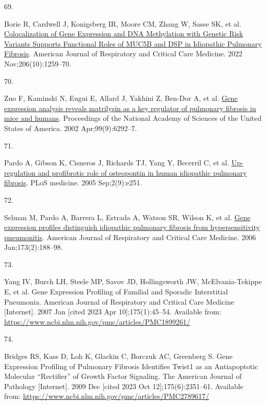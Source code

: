\documentclass[
]{article}
\newlength{\cslhangindent}
\newlength{\csllabelwidth}
\newlength{\cslentryspacingunit} %
\newenvironment{CSLReferences}[2] %
 {%
  \setlength{\parindent}{0pt}
  \ifodd #1
  \let\oldpar\par
  \def\par{\hangindent=\cslhangindent\oldpar}
  \fi
  \setlength{\parskip}{#2\cslentryspacingunit}
 }%
 {}
\newcommand{\CSLLeftMargin}[1]{\parbox[t]{\csllabelwidth}{#1}}
\newcommand{\CSLRightInline}[1]{\parbox[t]{\linewidth - \csllabelwidth}{#1}\break}
\begin{document}
\begin{CSLReferences}{0}{0}
\leavevmode{}%
\CSLLeftMargin{69. }%
\CSLRightInline{Borie R, Cardwell J, Konigsberg IR, Moore CM, Zhang W, Sasse SK, et al. \href{https://doi.org/10.1164/rccm.202110-2308OC}{Colocalization of {Gene} {Expression} and {DNA} {Methylation} with {Genetic} {Risk} {Variants} {Supports} {Functional} {Roles} of {MUC5B} and {DSP} in {Idiopathic} {Pulmonary} {Fibrosis}}. American Journal of Respiratory and Critical Care Medicine. 2022 Nov;206(10):1259--70. }

\leavevmode{}%
\CSLLeftMargin{70. }%
\CSLRightInline{Zuo F, Kaminski N, Eugui E, Allard J, Yakhini Z, Ben-Dor A, et al. \href{https://doi.org/10.1073/pnas.092134099}{Gene expression analysis reveals matrilysin as a key regulator of pulmonary fibrosis in mice and humans}. Proceedings of the National Academy of Sciences of the United States of America. 2002 Apr;99(9):6292--7. }

\leavevmode{}%
\CSLLeftMargin{71. }%
\CSLRightInline{Pardo A, Gibson K, Cisneros J, Richards TJ, Yang Y, Becerril C, et al. \href{https://doi.org/10.1371/journal.pmed.0020251}{Up-regulation and profibrotic role of osteopontin in human idiopathic pulmonary fibrosis}. PLoS medicine. 2005 Sep;2(9):e251. }

\leavevmode{}%
\CSLLeftMargin{72. }%
\CSLRightInline{Selman M, Pardo A, Barrera L, Estrada A, Watson SR, Wilson K, et al. \href{https://doi.org/10.1164/rccm.200504-644OC}{Gene expression profiles distinguish idiopathic pulmonary fibrosis from hypersensitivity pneumonitis}. American Journal of Respiratory and Critical Care Medicine. 2006 Jan;173(2):188--98. }

\leavevmode{}%
\CSLLeftMargin{73. }%
\CSLRightInline{Yang IV, Burch LH, Steele MP, Savov JD, Hollingsworth JW, McElvania-Tekippe E, et al. Gene {Expression} {Profiling} of {Familial} and {Sporadic} {Interstitial} {Pneumonia}. American Journal of Respiratory and Critical Care Medicine {[}Internet{]}. 2007 Jan {[}cited 2023 Apr 10{]};175(1):45--54. Available from: \url{https://www.ncbi.nlm.nih.gov/pmc/articles/PMC1899261/}}

\leavevmode{}%
\CSLLeftMargin{74. }%
\CSLRightInline{Bridges RS, Kass D, Loh K, Glackin C, Borczuk AC, Greenberg S. Gene {Expression} {Profiling} of {Pulmonary} {Fibrosis} {Identifies} {Twist1} as an {Antiapoptotic} {Molecular} {``{Rectifier}''} of {Growth} {Factor} {Signaling}. The American Journal of Pathology {[}Internet{]}. 2009 Dec {[}cited 2023 Oct 12{]};175(6):2351--61. Available from: \url{https://www.ncbi.nlm.nih.gov/pmc/articles/PMC2789617/}}


\end{CSLReferences}
\end{document}
